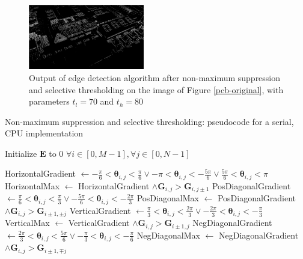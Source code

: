 \documentclass[journal]{IEEEtran}
\begin{document}
\begin{figure}[]
	\centering
	\includegraphics[width=0.45\textwidth]{pcb_edges.jpg}
	\caption{Output of edge detection algorithm after non-maximum suppression and selective thresholding on the image of Figure \ref{pcb-original}, with parameters $t_l = 70$ and $t_h = 80$}
    \label{pcb-edges}
\end{figure}
\begin{algorithm}[h]
	\smaller
	\label{non-maximum-suppression-selective-thresholding-algorithm}
	\caption{Non-maximum suppression and selective thresholding: pseudocode for a serial, CPU implementation}
	
	
	\nl Initialize $\boldsymbol{E}$ to 0 $\forall i \in [0, M - 1], \forall j \in [0, N - 1]$\;
	\nl {} {
		\nl {} {
			\nl HorizontalGradient $\gets -\frac{\pi}{6} < \boldsymbol{\theta}_{i, j} < \frac{\pi}{6} \vee -\pi < \boldsymbol{\theta}_{i, j} < -\frac{5 \pi}{6} \vee \frac{5\pi}{6} < \boldsymbol{\theta}_{i, j} < \pi$\;
			\nl HorizontalMax $\gets$ HorizontalGradient $\wedge \boldsymbol{G}_{i, j} > \boldsymbol{G}_{i, j \pm 1}$\;
			\nl PosDiagonalGradient $\gets \frac{\pi}{6} < \boldsymbol{\theta}_{i, j} < \frac{\pi}{3} \vee -\frac{5 \pi}{6} < \boldsymbol{\theta}_{i, j} < -\frac{2 \pi}{3}$\;
			\nl PosDiagonalMax $\gets$ PosDiagonalGradient $\wedge \boldsymbol{G}_{i, j} > \boldsymbol{G}_{i \pm 1, \pm j}$\;
			\nl VerticalGradient $\gets \frac{\pi}{3} < \boldsymbol{\theta}_{i, j} < \frac{2 \pi}{3} \vee -\frac{2 \pi}{3} < \boldsymbol{\theta}_{i, j} < -\frac{\pi}{3}$\;
			\nl VerticalMax $\gets$ VerticalGradient $\wedge \boldsymbol{G}_{i, j} > \boldsymbol{G}_{i \pm 1, j}$\;
			\nl NegDiagonalGradient $\gets \frac{2 \pi}{3} < \boldsymbol{\theta}_{i, j} < \frac{5 \pi}{6} \vee -\frac{\pi}{3} < \boldsymbol{\theta}_{i, j} < -\frac{\pi}{6}$\;
			\nl NegDiagonalMax $\gets$ NegDiagonalGradient $\wedge \boldsymbol{G}_{i, j} > \boldsymbol{G}_{i \pm 1, \mp j}$\;
			
}}
\end{algorithm}
\end{document}
